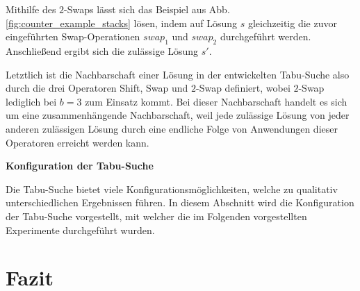 Mithilfe des $2$-Swaps lässt sich das Beispiel aus Abb. \ref{fig:counter_example_stacks} lösen,
indem auf Lösung $s$ gleichzeitig die zuvor eingeführten Swap-Operationen $swap_1$ und $swap_2$ durchgeführt werden.
Anschließend ergibt sich die zulässige Lösung $s'$.

Letztlich ist die Nachbarschaft einer Lösung in der entwickelten Tabu-Suche also durch die drei Operatoren
Shift, Swap und $2$-Swap definiert, wobei $2$-Swap lediglich bei $b = 3$ zum Einsatz kommt.
Bei dieser Nachbarschaft handelt es sich um eine zusammenhängende Nachbarschaft,
weil jede zulässige Lösung von jeder anderen zulässigen Lösung durch eine endliche Folge von Anwendungen
dieser Operatoren erreicht werden kann.\newline

\textbf{Konfiguration der Tabu-Suche}\newline


Die Tabu-Suche bietet viele Konfigurationsmöglichkeiten, welche zu qualitativ unterschiedlichen
Ergebnissen führen. In diesem Abschnitt wird die Konfiguration der Tabu-Suche vorgestellt,
mit welcher die im Folgenden vorgestellten Experimente durchgeführt wurden.


\vfill

\pagebreak

\section{Fazit}
\label{sec:conclusion}
